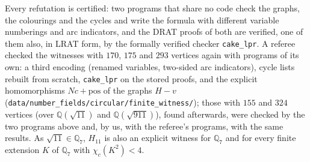 \documentclass[11pt,a4paper]{amsart}
\theoremstyle{remark}
\newcommand{\Q}{\mathbb{Q}}
\begin{document}
Every refutation is certified: two programs that share no code check the graphs, the colourings and the cycles and write the formula
with different variable numberings and arc indicators, and the DRAT proofs of both are verified, one of them also,
in LRAT form, by the formally verified checker \texttt{cake\_lpr}. A referee checked the witnesses with $170$, $175$
and $293$ vertices again with programs of its own: a third encoding (renamed variables, two-sided arc indicators),
cycle lists rebuilt from scratch, \texttt{cake\_lpr} on the stored proofs, and the explicit homomorphisms
$Nc+\mathrm{pos}$ of the graphs $H-v$ (\nolinkurl{data/number_fields/circular/finite_witness/}); those with $155$
and $324$ vertices (over $\Q(\sqrt{11})$ and $\Q(\sqrt{911})$), found afterwards, were checked by the two programs above
and, by us, with the referee's programs, with the same results. As $\sqrt{11}\in\Q_7$, $H_{11}$ is also an explicit
witness for $\Q_7$ and for every finite extension $K$ of $\Q_7$ with $\chi_c(K^2)<4$.
\end{document}
